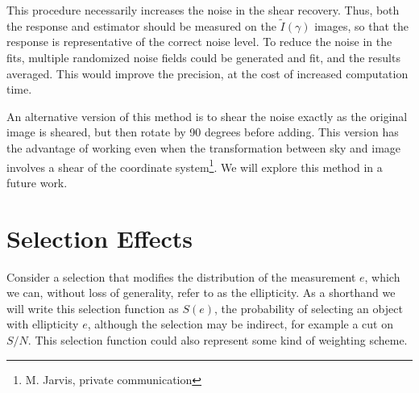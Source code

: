 \documentclass[usegraphicx,usenatbib]{mn2e}
\newcommand{\snr}{$S/N$}
\newcommand{\est}{$e$}
\newcommand{\mest}{e}
\begin{document}
This procedure necessarily increases the noise in the shear recovery.  Thus,
both the response and estimator should be measured on the $\tilde{I}(\gamma)$
images, so that the response is representative of the correct noise level.  To
reduce the noise in the fits, multiple randomized noise fields could be
generated and fit, and the results averaged.  This would improve the precision,
at the cost of increased computation time.

An alternative version of this method is to shear the noise exactly as the
original image is sheared, but then rotate by 90 degrees before adding.  This
version has the advantage of working even when the transformation between sky
and image involves a shear of the coordinate system\footnote{M. Jarvis, private
communication}. We will explore this method in a future work.


\section{Selection Effects} \label{sec:selection}


Consider a selection that modifies the distribution of the measurement \est,
which we can, without loss of generality, refer to as the ellipticity.  As
a shorthand we will write this selection function as $S(\mest)$, the probability of
selecting an object with ellipticity \est, although the selection may be
indirect, for example a cut on \snr.  This selection function could also
represent some kind of weighting scheme.
\end{document}
